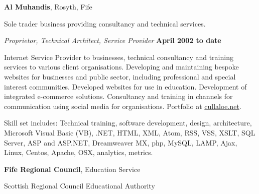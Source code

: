 \documentclass[10pt]{article}
\newenvironment{outerlist}[1][\enskip\textbullet]%
        {\begin{itemize}[#1]}{\end{itemize}%
         \vspace{-.6\baselineskip}}
\newenvironment{innerlist}[1][\enskip\textbullet]%
        {\begin{compactitem}[#1]}{\end{compactitem}}
\newcommand{\blankline}{\quad\pagebreak[2]}
\begin{document}
\blankline

%
\textbf{Al Muhandis}, Rosyth, Fife

Sole trader business providing consultancy and technical services.

\begin{outerlist}

\item[] \textit{Proprietor, Technical Architect, Service Provider}%
        \hfill \textbf{April 2002 to date}
\begin{innerlist}
\item Internet Service Provider to businesses, technical consultancy and training services to various client organisations. Developing and maintaining bespoke websites for businesses and public sector, including professional and special interest communities. Developed websites for use in education. Development of integrated e-commerce solutions. Consultancy and training in channels for communication using social media for organisations. Portfolio at \href{http://cullaloe.hostinguk.org}{cullaloe.net}.
\item Skill set includes: Technical training, software development, design, architecture, Microsoft Visual Basic (VB), .NET, HTML, XML, Atom, RSS, VSS, XSLT, SQL Server, ASP and ASP.NET, Dreamweaver MX, php, MySQL, LAMP, Ajax, Linux, Centos, Apache, OSX, analytics, metrics.
\end{innerlist}

\end{outerlist}

\blankline

%
\textbf{Fife Regional Council}, Education Service

Scottish Regional Council Educational Authority
\end{document}
